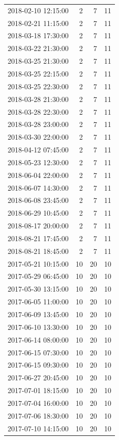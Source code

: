 \begin{tabular}{lrrr}
2018-02-10 12:15:00 & 2 & 7 & 11 \\
2018-02-21 11:15:00 & 2 & 7 & 11 \\
2018-03-18 17:30:00 & 2 & 7 & 11 \\
2018-03-22 21:30:00 & 2 & 7 & 11 \\
2018-03-25 21:30:00 & 2 & 7 & 11 \\
2018-03-25 22:15:00 & 2 & 7 & 11 \\
2018-03-25 22:30:00 & 2 & 7 & 11 \\
2018-03-28 21:30:00 & 2 & 7 & 11 \\
2018-03-28 22:30:00 & 2 & 7 & 11 \\
2018-03-28 23:00:00 & 2 & 7 & 11 \\
2018-03-30 22:00:00 & 2 & 7 & 11 \\
2018-04-12 07:45:00 & 2 & 7 & 11 \\
2018-05-23 12:30:00 & 2 & 7 & 11 \\
2018-06-04 22:00:00 & 2 & 7 & 11 \\
2018-06-07 14:30:00 & 2 & 7 & 11 \\
2018-06-08 23:45:00 & 2 & 7 & 11 \\
2018-06-29 10:45:00 & 2 & 7 & 11 \\
2018-08-17 20:00:00 & 2 & 7 & 11 \\
2018-08-21 17:45:00 & 2 & 7 & 11 \\
2018-08-21 18:45:00 & 2 & 7 & 11 \\
2017-05-21 10:15:00 & 10 & 20 & 10 \\
2017-05-29 06:45:00 & 10 & 20 & 10 \\
2017-05-30 13:15:00 & 10 & 20 & 10 \\
2017-06-05 11:00:00 & 10 & 20 & 10 \\
2017-06-09 13:45:00 & 10 & 20 & 10 \\
2017-06-10 13:30:00 & 10 & 20 & 10 \\
2017-06-14 08:00:00 & 10 & 20 & 10 \\
2017-06-15 07:30:00 & 10 & 20 & 10 \\
2017-06-15 09:30:00 & 10 & 20 & 10 \\
2017-06-27 20:45:00 & 10 & 20 & 10 \\
2017-07-01 18:15:00 & 10 & 20 & 10 \\
2017-07-04 16:00:00 & 10 & 20 & 10 \\
2017-07-06 18:30:00 & 10 & 20 & 10 \\
2017-07-10 14:15:00 & 10 & 20 & 10 \\

\end{tabular}
